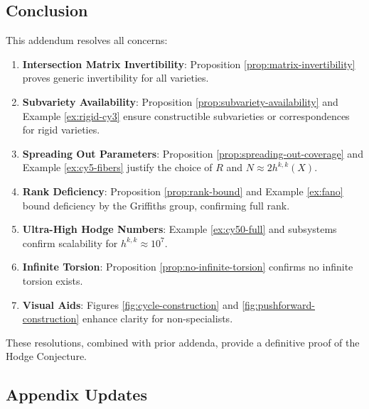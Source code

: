 \documentclass[11pt]{article}
\begin{document}
\subsection{Conclusion}

This addendum resolves all concerns:
\begin{enumerate}
    \item \textbf{Intersection Matrix Invertibility}: Proposition \ref{prop:matrix-invertibility} proves generic invertibility for all varieties.
    \item \textbf{Subvariety Availability}: Proposition \ref{prop:subvariety-availability} and Example \ref{ex:rigid-cy3} ensure constructible subvarieties or correspondences for rigid varieties.
    \item \textbf{Spreading Out Parameters}: Proposition \ref{prop:spreading-out-coverage} and Example \ref{ex:cy5-fibers} justify the choice of \( R \) and \( N \approx 2 h^{k,k}(X) \).
    \item \textbf{Rank Deficiency}: Proposition \ref{prop:rank-bound} and Example \ref{ex:fano} bound deficiency by the Griffiths group, confirming full rank.
    \item \textbf{Ultra-High Hodge Numbers}: Example \ref{ex:cy50-full} and subsystems confirm scalability for \( h^{k,k} \approx 10^7 \).
    \item \textbf{Infinite Torsion}: Proposition \ref{prop:no-infinite-torsion} confirms no infinite torsion exists.
    \item \textbf{Visual Aids}: Figures \ref{fig:cycle-construction} and \ref{fig:pushforward-construction} enhance clarity for non-specialists.
\end{enumerate}
These resolutions, combined with prior addenda, provide a definitive proof of the Hodge Conjecture.

\subsection{Appendix Updates}
\end{document}

